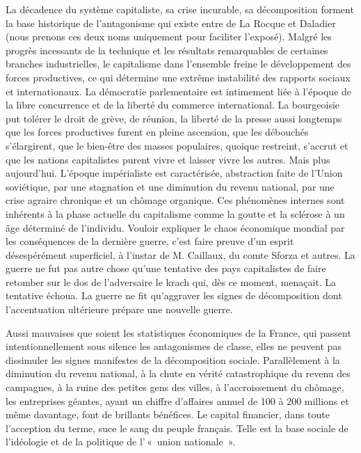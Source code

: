 \documentclass[french,twoside]{book} %
\begin{document}
La décadence du système capitaliste, sa crise incurable, sa décomposition forment la base historique de l’antagonisme qui existe entre de La Rocque et Daladier (nous prenons ces deux noms uniquement pour faciliter l’exposé). Malgré les progrès incessants de la technique et les résultats remarquables de certaines branches industrielles, le capitalisme dans l’ensemble freine le développement des forces productives, ce qui détermine une extrême instabilité des rapports sociaux et internationaux. La démocratie parlementaire est intimement liée à l’époque de la libre concurrence et de la liberté du commerce international. La bourgeoisie put tolérer le droit de grève, de réunion, la liberté de la presse aussi longtemps que les forces productives furent en pleine ascension, que les débouchés s’élargirent, que le bien-être des masses populaires, quoique restreint, s’accrut et que les nations capitalistes purent vivre et laisser vivre les autres. Mais plus aujourd’hui. L’époque impérialiste est caractérisée, abstraction faite de l’Union soviétique, par une stagnation et une diminution du revenu national, par une crise agraire chronique et un chômage organique. Ces phénomènes  internes sont inhérents à la phase actuelle du capitalisme comme la goutte et la sclérose à un âge déterminé de l’individu. Vouloir expliquer le chaos économique mondial par les conséquences de la dernière guerre, c’est faire preuve d’un esprit désespérément superficiel, à l’instar de M. Caillaux, du comte Sforza et autres. La guerre ne fut pas autre chose qu’une tentative des pays capitalistes de faire retomber sur le dos de l’adversaire le krach qui, dès ce moment, menaçait. La tentative échoua. La guerre ne fit qu’aggraver les signes de décomposition dont l’accentuation ultérieure prépare une nouvelle guerre.\par
Aussi mauvaises que soient les statistiques économiques de la France, qui passent intentionnellement sous silence les antagonismes de classe, elles ne peuvent pas dissimuler les signes manifestes de la décomposition sociale. Parallèlement à la diminution du revenu national, à la chute en vérité catastrophique du revenu des campagnes, à la ruine des petites gens des villes, à l’accroissement du chômage, les entreprises géantes, ayant un chiffre d’affaires annuel de 100 à 200 millions et même davantage, font de brillants bénéfices. Le capital financier, dans toute l’acception du terme, suce le sang du peuple français. Telle est la base sociale de l’idéologie et de la politique de l’ « union nationale ».\par
\end{document}
